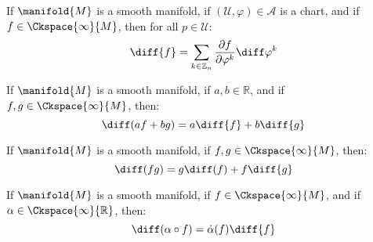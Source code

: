         \begin{theorem}
            If $\manifold{M}$ is a smooth manifold, if
            $(\mathcal{U},\varphi)\in\mathcal{A}$ is a chart, and if
            $f\in\Ckspace{\infty}{M}$, then for all $p\in\mathcal{U}$:
            \begin{equation}
                \diff{f}=\sum_{k\in\mathbb{Z}_{n}}
                    \frac{\partial{f}}{\partial\varphi^{k}}
                        \diff\varphi^{k}
            \end{equation}
        \end{theorem}
        \begin{theorem}
            If $\manifold{M}$ is a smooth manifold, if $a,b\in\mathbb{R}$,
            and if $f,g\in\Ckspace{\infty}{M}$, then:
            \begin{equation}
                \diff(af+bg)=a\diff{f}+b\diff{g}
            \end{equation}
        \end{theorem}
        \begin{theorem}
            If $\manifold{M}$ is a smooth manifold, if
            $f,g\in\Ckspace{\infty}{M}$, then:
            \begin{equation}
                \diff(fg)=g\diff(f)+f\diff{g}
            \end{equation}
        \end{theorem}
        \begin{theorem}
            If $\manifold{M}$ is a smooth manifold, if
            $f\in\Ckspace{\infty}{M}$, and if
            $\alpha\in\Ckspace{\infty}{\mathbb{R}}$, then:
            \begin{equation}
                \diff(\alpha\circ{f})=\dot{\alpha}(f)\diff{f}
            \end{equation}
        \end{theorem}
